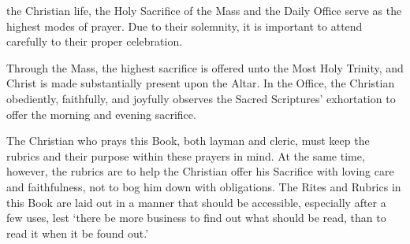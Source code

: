 {}
 the Christian life, the Holy Sacrifice of the Mass and the Daily Office serve as the highest modes of prayer. Due to their solemnity, it is important to attend carefully to their proper celebration.

	Through the Mass, the highest sacrifice is offered unto the Most Holy Trinity, and Christ is made substantially present upon the Altar. In the Office, the Christian obediently, faithfully, and joyfully observes the Sacred Scriptures' exhortation to offer the morning and evening sacrifice.
	
	The Christian who prays this Book, both layman and cleric, must keep the rubrics and their purpose within these prayers in mind. At the same time, however, the rubrics are to help the Christian offer his Sacrifice with loving care and faithfulness, not to bog him down with obligations. The Rites and Rubrics in this Book are laid out in a manner that should be accessible, especially after a few uses, lest `there be more business to find out what should be read, than to read it when it be found out.'
